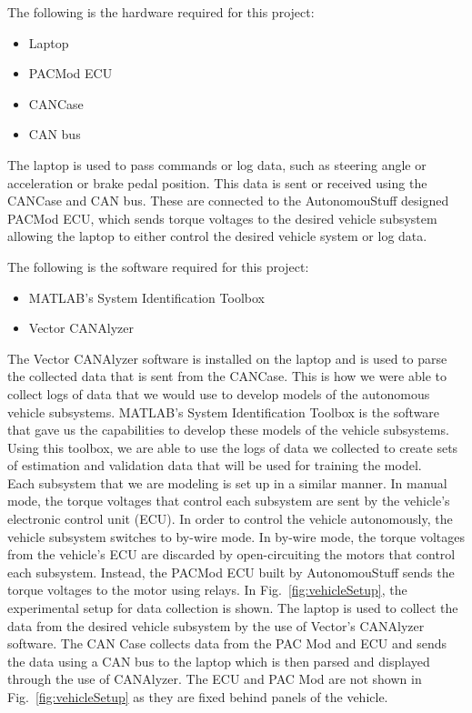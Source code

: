 \documentclass[journal,twoside,web]{ieeecolor}
\begin{document}
\noindent The following is the hardware required for this project:  
	\begin{itemize}
    		\item Laptop
    		\item PACMod ECU
    		\item CANCase 
    		\item CAN bus 
 	\end{itemize}
 	
 	
	\noindent The laptop is used to pass commands or log data, such as steering angle or acceleration or brake pedal position. This data is sent or received using the CANCase and CAN bus. These are connected to the AutonomouStuff designed PACMod ECU, which sends torque voltages to the desired vehicle subsystem allowing the laptop to either control the desired vehicle system or log data.\bigskip

	\noindent The following is the software required for this project: 
	\begin{itemize}
    		\item MATLAB's System Identification Toolbox 
    		\item Vector CANAlyzer 
 	\end{itemize}
 	
 	
\noindent The Vector CANAlyzer software is installed on the laptop and is used to parse the collected data that is sent from the CANCase. This is how we were able to collect logs of data that we would use to develop models of the autonomous vehicle subsystems. MATLAB's System Identification Toolbox is the software that gave us the capabilities to develop these models of the vehicle subsystems. Using this toolbox, we are able to use the logs of data we collected to create sets of estimation and validation data that will be used for training the model.
\\

Each subsystem that we are modeling is set up in a similar manner. In manual mode, the torque voltages that control each subsystem are sent by the vehicle's electronic control unit (ECU). In order to control the vehicle autonomously, the vehicle subsystem switches to by-wire mode. In by-wire mode, the torque voltages from the vehicle's ECU are discarded by open-circuiting the motors that control each subsystem. Instead, the PACMod ECU built by AutonomouStuff sends the torque voltages to the motor using relays. In Fig.~\ref{fig:vehicleSetup}, the experimental setup for data collection is shown. The laptop is used to collect the data from the desired vehicle subsystem by the use of Vector's CANAlyzer software. The CAN Case collects data from the PAC Mod and ECU and sends the data using a CAN bus to the laptop which is then parsed and displayed through the use of CANAlyzer. The ECU and PAC Mod are not shown in Fig.~\ref{fig:vehicleSetup} as they are fixed behind panels of the vehicle. 
\\
\end{document}
